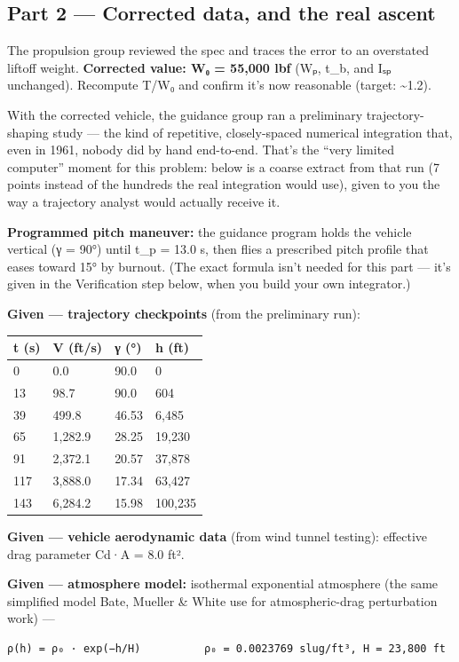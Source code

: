 \documentclass[
  10pt,
]{article}
\begin{document}
\hypertarget{part-2-corrected-data-and-the-real-ascent}{%
\subsection{Part 2 --- Corrected data, and the real
ascent}\label{part-2-corrected-data-and-the-real-ascent}}

The propulsion group reviewed the spec and traces the error to an
overstated liftoff weight. \textbf{Corrected value: W₀ = 55,000 lbf}
(Wₚ, t\_b, and Iₛₚ unchanged). Recompute T/W₀ and confirm it's now
reasonable (target: \textasciitilde1.2).

With the corrected vehicle, the guidance group ran a preliminary
trajectory-shaping study --- the kind of repetitive, closely-spaced
numerical integration that, even in 1961, nobody did by hand end-to-end.
That's the ``very limited computer'' moment for this problem: below is a
coarse extract from that run (7 points instead of the hundreds the real
integration would use), given to you the way a trajectory analyst would
actually receive it.

\textbf{Programmed pitch maneuver:} the guidance program holds the
vehicle vertical (γ = 90°) until t\_p = 13.0 s, then flies a prescribed
pitch profile that eases toward 15° by burnout. (The exact formula isn't
needed for this part --- it's given in the Verification step below, when
you build your own integrator.)

\textbf{Given --- trajectory checkpoints} (from the preliminary run):

\begin{longtable}[]{@{}llll@{}}
\toprule
t (s) & V (ft/s) & γ (°) & h (ft)\tabularnewline
\midrule
\endhead
0 & 0.0 & 90.0 & 0\tabularnewline
13 & 98.7 & 90.0 & 604\tabularnewline
39 & 499.8 & 46.53 & 6,485\tabularnewline
65 & 1,282.9 & 28.25 & 19,230\tabularnewline
91 & 2,372.1 & 20.57 & 37,878\tabularnewline
117 & 3,888.0 & 17.34 & 63,427\tabularnewline
143 & 6,284.2 & 15.98 & 100,235\tabularnewline
\bottomrule
\end{longtable}

\textbf{Given --- vehicle aerodynamic data} (from wind tunnel testing):
effective drag parameter Cd·A = 8.0 ft².

\textbf{Given --- atmosphere model:} isothermal exponential atmosphere
(the same simplified model Bate, Mueller \& White use for
atmospheric-drag perturbation work) ---

\begin{verbatim}
ρ(h) = ρ₀ · exp(−h/H)          ρ₀ = 0.0023769 slug/ft³, H = 23,800 ft
\end{verbatim}
\end{document}
